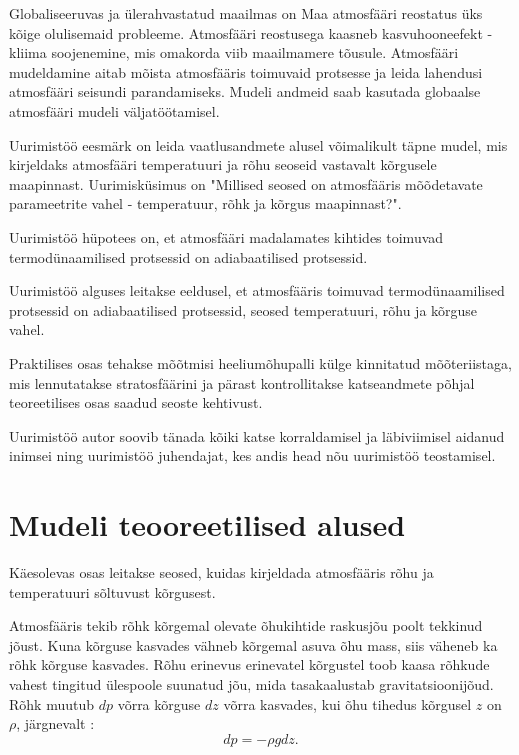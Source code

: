 \documentclass{trkut}%
\begin{document}
\maketitle%
\tableofcontents%

\nummerdame%
Globaliseeruvas ja ülerahvastatud maailmas on Maa atmosfääri reostatus üks kõige olulisemaid probleeme. Atmosfääri reostusega kaasneb kasvuhooneefekt - kliima soojenemine, mis omakorda viib maailmamere tõusule. Atmosfääri mudeldamine aitab mõista atmosfääris toimuvaid protsesse ja leida lahendusi atmosfääri seisundi parandamiseks. Mudeli andmeid saab kasutada globaalse atmosfääri mudeli väljatöötamisel.

Uurimistöö eesmärk on leida vaatlusandmete alusel võimalikult täpne mudel, mis kirjeldaks atmosfääri temperatuuri ja rõhu seoseid vastavalt kõrgusele maapinnast. Uurimisküsimus on "Millised seosed on atmosfääris mõõdetavate parameetrite vahel - temperatuur, rõhk ja kõrgus maapinnast?".

Uurimistöö hüpotees on, et atmosfääri madalamates kihtides toimuvad termodünaamilised protsessid on adiabaatilised protsessid.

Uurimistöö alguses leitakse eeldusel, et atmosfääris toimuvad termodünaamilised protsessid on adiabaatilised protsessid, seosed temperatuuri, rõhu ja kõrguse vahel.

Praktilises osas tehakse mõõtmisi heeliumõhupalli külge kinnitatud mõõteriistaga, mis lennutatakse stratosfäärini ja pärast kontrollitakse katseandmete põhjal teoreetilises osas saadud seoste kehtivust.

Uurimistöö autor soovib tänada kõiki katse korraldamisel ja läbiviimisel aidanud inimsei ning uurimistöö juhendajat, kes andis head nõu uurimistöö teostamisel.





\chapter{Mudeli teooreetilised alused}
Käesolevas osas leitakse seosed, kuidas kirjeldada atmosfääris rõhu ja temperatuuri sõltuvust kõrgusest.

Atmosfääris tekib rõhk kõrgemal olevate õhukihtide raskusjõu poolt tekkinud jõust. Kuna kõrguse kasvades vähneb kõrgemal asuva õhu mass, siis väheneb ka rõhk kõrguse kasvades. Rõhu erinevus erinevatel kõrgustel toob kaasa rõhkude vahest tingitud ülespoole suunatud jõu, mida tasakaalustab gravitatsioonijõud. Rõhk muutub $dp$ võrra kõrguse $dz$ võrra kasvades, kui õhu tihedus kõrgusel $z$ on $\rho$, järgnevalt \parencite[67--68]{raamat1}:
\begin{equation}\label{eq10}
dp=-\rho gdz.   
\end{equation}
\end{document}
